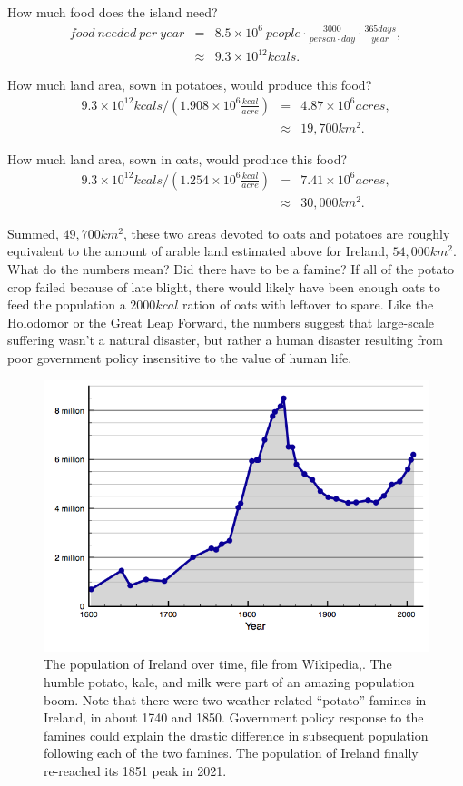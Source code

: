 \documentclass[jou]{apa7}
\newcommand{\bea}{\begin{eqnarray}}
\newcommand{\eea}{\end{eqnarray}}
\begin{document}
How much food does the island need?
\bea
food~needed~per~year &=& 8.5\times10^6~people
	\cdot \frac{3000}{person\cdot day }
	\cdot \frac{365days}{year} , \nonumber \\
&\approx& 9.3\times 10^{12} kcals . 
\eea       

How much land area, sown in potatoes, would produce this food?
\bea
9.3\times10^{12}kcals /\left(1.908\times 10^6\frac{kcal}{acre}\right) &=& 4.87\times10^6 acres , \nonumber\\
 &\approx& 19,700 km^2 . 
\eea

How much land area, sown in oats, would produce this food?
\bea
9.3\times10^{12}kcals /\left(1.254\times10^6\frac{kcal}{acre}\right) &=& 7.41 \times10^6 acres , \nonumber \\
 &\approx& 30,000 km^2 . 
\eea

Summed, $49,700km^2$, these two areas devoted to oats and potatoes are roughly equivalent to the amount of arable land estimated above for Ireland, $54,000km^2$.\cite{arable_percentage}  
What do the numbers mean?  Did there have to be a famine?  If all of the potato crop failed because of late blight, there would likely have been enough oats to feed the population a $2000kcal$ ration of oats with leftover to spare.  
Like the Holodomor or the Great Leap Forward, the numbers suggest that large-scale suffering wasn't  a natural disaster, but rather a human disaster resulting from poor government policy insensitive to the value of human life.    



\begin{figure}[ht!]
\centering
\includegraphics[width=\columnwidth]{Population_of_Ireland_since_1600.png}
\caption{
The population of Ireland over time, file from Wikipedia,\cite{pop_image}.
The humble potato, kale, and milk were part of an amazing population boom.  Note that there were two weather-related ``potato'' famines in Ireland, in about 1740 and 1850.  Government policy response to the famines could explain the drastic difference in subsequent population following each of the two famines.  The population of Ireland finally re-reached its 1851 peak in 2021.\cite{Ireland_5M}  
}
\label{ireland_population}
\end{figure}
\end{document}
